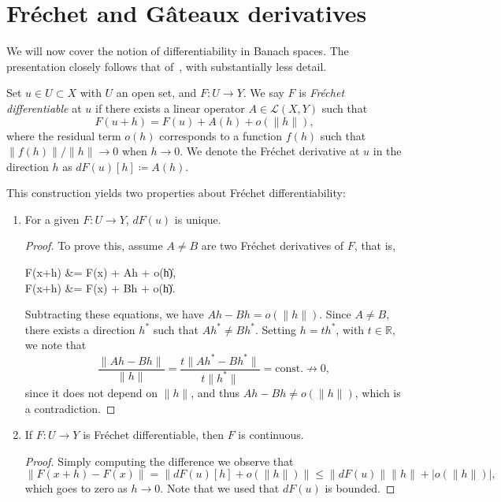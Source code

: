 \section{Fréchet and Gâteaux derivatives}\label{sec:frechet-gateaux-derivatives}
We will now cover the notion of differentiability in Banach spaces. The presentation closely follows that of~\cite{ambrosetti1995primer}, with substantially less detail.
\begin{definition}
    Set $u\in U \subset X$ with $U$ an open set, and $F:U\to Y$. We say $F$ is \emph{Fréchet differentiable} at $u$ if there exists a linear operator $A\in \mathcal{L}(X,Y)$ such that
    \begin{equation}\label{eq:frechet-derivative}
        F(u+h)=F(u)+A(h)+o(\|h\|),
    \end{equation}
    where the residual term $o(h)$ corresponds to a function $f(h)$ such that $\|f(h)\|/\|h\| \to 0$ when $h\to 0$. We denote the Fréchet derivative at $u$ in the direction $h$ as $dF(u)[h] \coloneqq A(h)$.
\end{definition}
This construction yields two properties about Fréchet differentiability:
\begin{enumerate}
    \item For a given $F:U\to Y$, $dF(u)$ is unique. 
    \begin{proof}
            To prove this, assume $A\neq B$ are two Fréchet derivatives of $F$, that is, 
        \begin{tightalign*}
                F(x+h) &= F(x) + Ah + o(\|h\|), \\
                F(x+h) &= F(x) + Bh + o(\|h\|).
        \end{tightalign*}
        Subtracting these equations, we have $Ah - Bh = o(\|h\|)$. Since $A\neq B$, there exists a direction $h^*$ such that $Ah^* \neq Bh^*$. Setting $h=th^*$, with $t\in \mathbb{R}$, we note that
        \begin{equation*}
            \frac{\|Ah-Bh\|}{\|h\|} = \frac{t\|Ah^*-Bh^*\|}{t\|h^*\|} = \text{const.} \nrightarrow 0,
        \end{equation*}
        since it does not depend on $\|h\|$, and thus $Ah - Bh \neq o(\|h\|)$, which is a contradiction. 
    \end{proof}
    \item If $F:U\to Y$ is Fréchet differentiable, then $F$ is continuous.
        \begin{proof}
            Simply computing the difference we observe that
            $$\|F(x+h) - F(x)\| = \| dF(u)[h] + o(\|h\|)\| \leq \|dF(u)\| \| h\| + |o(\|h\|)|, $$
            which goes to zero as $h\to 0$. Note that we used that $dF(u)$ is bounded.
        \end{proof}

\end{enumerate}

